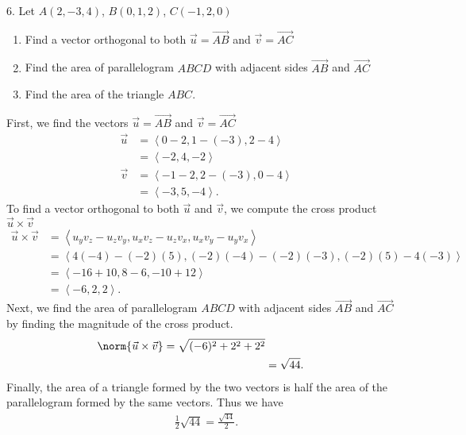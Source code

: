 \documentclass{report}
\begin{document}
    \pagebreak \bigbreak \noindent 
    \begin{mdframed}
        6. Let $A(2, -3, 4)$, $B(0, 1, 2)$, $C(-1, 2, 0)$
        \begin{enumerate}[label=(\alph*)]
            \item Find a vector orthogonal to both $\vec{u} = \vec{AB}$ and $\vec{v} = \vec{AC} $
            \item Find the area of parallelogram $ABCD$ with adjacent sides $\vec{AB}$ and $\vec{AC} $
            \item Find the area of the triangle $ABC$.
        \end{enumerate}
    \end{mdframed}
    \bigbreak \noindent 
    First, we find the vectors $\vec{u} = \vec{AB}$ and $\vec{v} = \vec{AC}$
    \begin{align*}
        \vec{u} &= \left\langle 0-2,1-(-3),2-4 \right\rangle \\
        &= \left\langle -2, 4, -2  \right\rangle \\
        \vec{v} &= \left\langle -1-2,2-(-3),0-4 \right\rangle \\
                &= \left\langle -3,5,-4 \right\rangle
    .\end{align*}
    \bigbreak \noindent 
    To find a vector orthogonal to both $\vec{u}$ and $\vec{v}$, we compute the cross product $\vec{u} \times \vec{v}$
    \begin{align*}
        \vec{u} \times \vec{v} &= \left\langle u_{y}v_{z} - u_{z}v_{y}, u_{x}v_{z}-u_{z}v_{x}, u_{x}v_{y} - u_{y}v_{x} \right\rangle \\
        &= \left\langle 4(-4)-(-2)(5), (-2)(-4) - (-2)(-3), (-2)(5)-4(-3) \right\rangle \\
        &= \left\langle -16+10, 8-6, -10+12 \right\rangle \\
        &=\left\langle -6,2,2 \right\rangle
    .\end{align*}
    \bigbreak \noindent 
    Next, we find the area of parallelogram $ABCD$ with adjacent sides $\vec{AB}$ and $\vec{AC} $ by finding the magnitude of the cross product.
    \begin{align*}
        \norm{\vec{u} \times \vec{v}} = \sqrt{(-6)^{2} + 2^{2} + 2^{2}} \\
        &=\sqrt{44}
    .\end{align*}
    \bigbreak \noindent 
    Finally, the area of a triangle formed by the two vectors is half the area of the parallelogram formed by the same vectors. Thus we have
    \begin{align*}
        \frac{1}{2}\sqrt{44} = \frac{\sqrt{44}}{2}
    .\end{align*}
    
    



     
 
\end{document}
